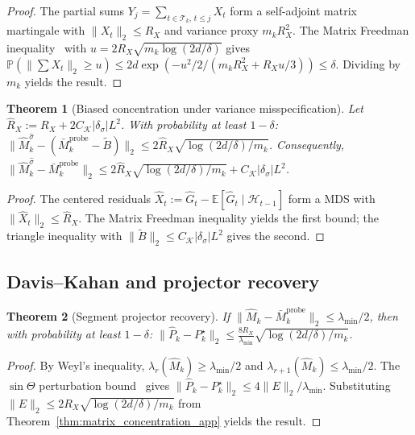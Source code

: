 \documentclass{article}
\newcommand{\E}{\mathbb{E}}
\newcommand{\Prob}{\mathbb{P}}
\newcommand{\cH}{\mathcal{H}}
\newcommand{\cT}{\mathcal{T}}
\newtheorem{theorem}{Theorem}
\begin{document}
\begin{proof}
The partial sums $Y_j = \sum_{t \in \cT_k,\, t \le j} X_t$ form a self-adjoint matrix martingale with $\|X_t\|_2 \le R_X$ and variance proxy $m_k R_X^2$.
The Matrix Freedman inequality~\citep{tropp2012user} with $u = 2R_X\sqrt{m_k\log(2d/\delta)}$ gives
$\Prob(\|\sum X_t\|_2 \ge u) \le 2d\exp(-u^2/2/(m_k R_X^2 + R_X u/3)) \le \delta$.
Dividing by $m_k$ yields the result.
\end{proof}

\begin{theorem}[Biased concentration under variance misspecification]
\label{thm:biased_concentration}
Let $\hat R_X := R_X + 2C_{\mathcal K}|\delta_\sigma|L^2$.
With probability at least $1-\delta$:
$\|\widehat M_k^{\hat\sigma} - (\bar M_k^{\mathrm{probe}} - \widetilde B)\|_2 \le 2\hat R_X\sqrt{\log(2d/\delta)/m_k}$.
Consequently, $\|\widehat M_k^{\hat\sigma} - \bar M_k^{\mathrm{probe}}\|_2 \le 2\hat R_X\sqrt{\log(2d/\delta)/m_k} + C_{\mathcal K}|\delta_\sigma|L^2$.
\end{theorem}

\begin{proof}
The centered residuals $\hat X_t := \hat G_t - \E[\hat G_t \mid \cH_{t-1}]$ form a MDS with $\|\hat X_t\|_2 \le \hat R_X$.
The Matrix Freedman inequality yields the first bound; the triangle inequality with $\|\widetilde B\|_2 \le C_{\mathcal K}|\delta_\sigma|L^2$ gives the second.
\end{proof}

\subsection{Davis--Kahan and projector recovery}

\begin{theorem}[Segment projector recovery]
\label{thm:davis_kahan_application}
If $\|\widehat{M}_k - \bar{M}_k^{\mathrm{probe}}\|_2 \le \lambda_{\min}/2$, then with probability at least $1-\delta$:
$\|\widehat{P}_k - P_k^\star\|_2 \le \frac{8R_X}{\lambda_{\min}} \sqrt{\log(2d/\delta)/m_k}$.
\end{theorem}

\begin{proof}
By Weyl's inequality, $\lambda_r(\widehat{M}_k) \ge \lambda_{\min}/2$ and $\lambda_{r+1}(\widehat{M}_k) \le \lambda_{\min}/2$.
The $\sin\Theta$ perturbation bound~\citep{davis1970rotation,yu2015useful} gives $\|\widehat{P}_k - P_k^\star\|_2 \le 4\|E\|_2/\lambda_{\min}$.
Substituting $\|E\|_2 \le 2R_X\sqrt{\log(2d/\delta)/m_k}$ from Theorem~\ref{thm:matrix_concentration_app} yields the result.
\end{proof}
\end{document}

